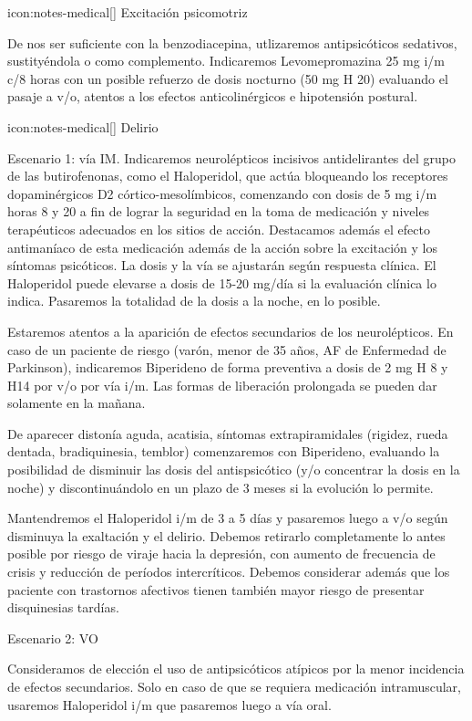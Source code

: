 \documentclass[encares.tex]{subfiles}
\begin{document}
icon:notes-medical[] Excitación psicomotriz

De nos ser suficiente con la benzodiacepina, utlizaremos antipsicóticos sedativos, sustityéndola o como complemento. Indicaremos Levomepromazina 25 mg i/m c/8 horas con un posible refuerzo de dosis nocturno (50 mg H 20) evaluando el pasaje a v/o, atentos a los efectos anticolinérgicos e hipotensión postural.

icon:notes-medical[] Delirio

Escenario 1: vía IM.
Indicaremos neurolépticos incisivos antidelirantes del grupo de las butirofenonas, como el Haloperidol, que actúa bloqueando los receptores dopaminérgicos D2 córtico-mesolímbicos, comenzando con dosis de 5 mg i/m horas 8 y 20 a fin de lograr la seguridad en la toma de medicación y niveles terapéuticos adecuados en los sitios de acción. Destacamos además el efecto antimaníaco de esta medicación además de la acción sobre la excitación y los síntomas psicóticos. La dosis y la vía se ajustarán según respuesta clínica. El Haloperidol puede elevarse a dosis de 15-20 mg/día si la evaluación clínica lo indica. Pasaremos la totalidad de la dosis a la noche, en lo posible.

Estaremos atentos a la aparición de efectos secundarios de los neurolépticos. En caso de un paciente de riesgo (varón, menor de 35 años, AF de Enfermedad de Parkinson), indicaremos Biperideno de forma preventiva a dosis de 2 mg H 8 y H14 por v/o por vía i/m. Las formas de liberación prolongada se pueden dar solamente en la mañana.

De aparecer distonía aguda, acatisia, síntomas extrapiramidales (rigidez, rueda dentada, bradiquinesia, temblor) comenzaremos con Biperideno, evaluando la posibilidad de disminuir las dosis del antispsicótico (y/o concentrar la dosis en la noche) y discontinuándolo en un plazo de 3 meses si la evolución lo permite.

Mantendremos el Haloperidol i/m de 3 a 5 días y pasaremos luego a v/o según disminuya la exaltación y el delirio. Debemos retirarlo completamente lo antes posible por riesgo de viraje hacia la depresión, con aumento de frecuencia de crisis y reducción de períodos intercríticos. Debemos considerar además que los paciente con trastornos afectivos tienen también mayor riesgo de presentar disquinesias tardías.

Escenario 2: VO

Consideramos de elección el uso de antipsicóticos atípicos por la menor incidencia de efectos secundarios. Solo en caso de que se requiera medicación intramuscular, usaremos Haloperidol i/m que pasaremos luego a vía oral.
\end{document}
